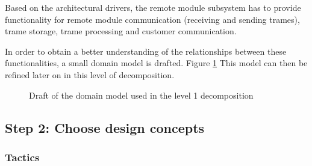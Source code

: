 \npar Based on the architectural drivers, the remote module subsystem has to
provide functionality for remote module communication (receiving and sending
trames), trame storage, trame processing and customer communication. 

\npar In order to obtain a better understanding of the relationships between
these functionalities, a small domain model is drafted. Figure
\ref{fig:add/it1/draft} This model can then be refined later on
in this level of decomposition.

\begin{figure}[H]
	\begin{centering}
		\caption{Draft of the domain model used in the level 1 decomposition}
		\label{fig:add/it1/draft}
	\end{centering}
\end{figure}

\subsection{Step 2: Choose design concepts}
\label{add:it1/concepts}

\subsubsection{Tactics}
\label{add:it1/tactics}

